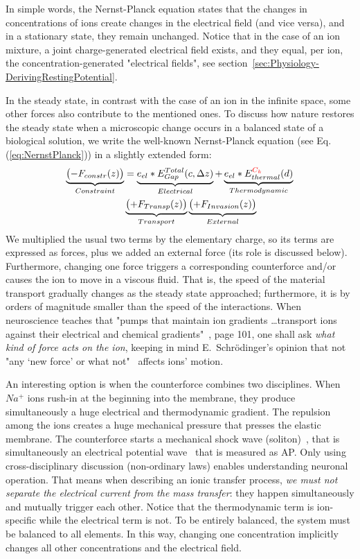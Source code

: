 In simple words, the Nernst-Planck equation states that the changes in
concentrations of ions create changes in the electrical field (and
vice versa), and in a stationary state, they remain unchanged.
Notice that in the case of an ion mixture, a joint charge-generated electrical field exists, and they equal, per ion, the concentration-generated "electrical fields", see section~\ref{sec:Physiology-DerivingRestingPotential}.

In the steady state, in contrast with the case of an ion in the infinite space, some other forces also contribute to
the mentioned ones. To discuss how nature restores the steady state when a microscopic change occurs in a
balanced state of a biological solution, we write the well-known Nernst-Planck
equation (see Eq.(\ref{eq:NernstPlanck})) in a slightly extended form:
%
\begin{align}
	\underbrace{\bigl(-F_{constr}(z)\bigr)}_{Constraint} &= \underbrace{ e_{el}*E_{Gap}^{Total}(c,\Delta z)}_{Electrical} +\underbrace{e_{el}*E_{thermal}^{\textcolor{red}{C_k}}(d)}_{Thermodynamic}\\
	&\underbrace{\bigl(+F_{Transp}(z)\bigr)}_{Transport}\underbrace{\bigl(+F_{Invasion}(z)\bigr)}_{External} 
	\label{eq:NernstPlanckExtended}
\end{align}
We multiplied the usual two terms by the elementary charge, so its terms are expressed as forces, plus we added an external force (its role is discussed below). Furthermore, changing one force triggers a corresponding counterforce and/or causes the ion to move in a viscous fluid. That is, the speed of the material transport gradually changes
as the steady state approached; furthermore, it is by orders of magnitude smaller than the speed of the interactions. 
When neuroscience teaches that "pumps that maintain
ion gradients \dots transport ions against their
electrical and chemical gradients"~\cite{PrinciplesNeuralScience:2013}, page 101, one shall ask \textit{what kind of force acts on the ion}, keeping in mind
E.~Schrödinger's opinion that not "any ‘new force’ or what not"~\cite{Schrodinger:1992} affects ions' motion.

An interesting option is when the counterforce combines two disciplines.
When $Na^+$ ions rush-in at the beginning into the membrane,
they produce simultaneously a huge electrical and thermodynamic gradient.
The repulsion among the ions creates a huge mechanical pressure
that presses the elastic membrane. The counterforce starts a mechanical 
shock wave (soliton)~\cite{SolitonPropagation:2005}, that is simultaneously
an electrical potential wave~\cite{VeghUnifiedCrossdisciplinaryModel:2026} that is measured as \gls{AP}. Only using  cross-disciplinary discussion (non-ordinary laws) enables understanding neuronal operation.  
That means when describing an ionic transfer process, \textit{we must not separate the electrical current from the mass transfer}: they happen simultaneously and mutually trigger each other. Notice that the thermodynamic term is ion-specific while the electrical term is not. To be entirely balanced, the system must be balanced to all elements. In this way, changing one concentration implicitly changes all other concentrations and the electrical field.

